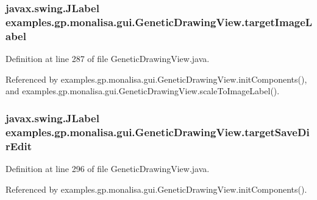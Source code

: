 \hypertarget{classexamples_1_1gp_1_1monalisa_1_1gui_1_1_genetic_drawing_view_a4c295f7e484fb3f5c830c42e8dc34244}{
\subsubsection[{target\-Image\-Label}]{\setlength{\rightskip}{0pt plus 5cm}javax.\-swing.\-J\-Label examples.\-gp.\-monalisa.\-gui.\-Genetic\-Drawing\-View.\-target\-Image\-Label\hspace{0.3cm}{\ttfamily [private]}}}\label{classexamples_1_1gp_1_1monalisa_1_1gui_1_1_genetic_drawing_view_a4c295f7e484fb3f5c830c42e8dc34244}


Definition at line 287 of file Genetic\-Drawing\-View.\-java.



Referenced by examples.\-gp.\-monalisa.\-gui.\-Genetic\-Drawing\-View.\-init\-Components(), and examples.\-gp.\-monalisa.\-gui.\-Genetic\-Drawing\-View.\-scale\-To\-Image\-Label().

\hypertarget{classexamples_1_1gp_1_1monalisa_1_1gui_1_1_genetic_drawing_view_a3cae3769d4e005296805994ff5d40917}{
\subsubsection[{target\-Save\-Dir\-Edit}]{\setlength{\rightskip}{0pt plus 5cm}javax.\-swing.\-J\-Label examples.\-gp.\-monalisa.\-gui.\-Genetic\-Drawing\-View.\-target\-Save\-Dir\-Edit\hspace{0.3cm}{\ttfamily [private]}}}\label{classexamples_1_1gp_1_1monalisa_1_1gui_1_1_genetic_drawing_view_a3cae3769d4e005296805994ff5d40917}


Definition at line 296 of file Genetic\-Drawing\-View.\-java.



Referenced by examples.\-gp.\-monalisa.\-gui.\-Genetic\-Drawing\-View.\-init\-Components().

